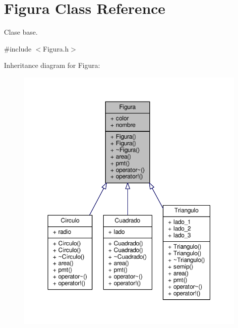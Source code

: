 \hypertarget{class_figura}{\section{Figura Class Reference}
\label{class_figura}
}


Clase base.  




{\ttfamily \#include $<$Figura.\+h$>$}



Inheritance diagram for Figura\+:\nopagebreak
\begin{figure}[H]
\begin{center}
\leavevmode
\includegraphics[width=347pt]{class_figura__inherit__graph}
\end{center}
\end{figure}
